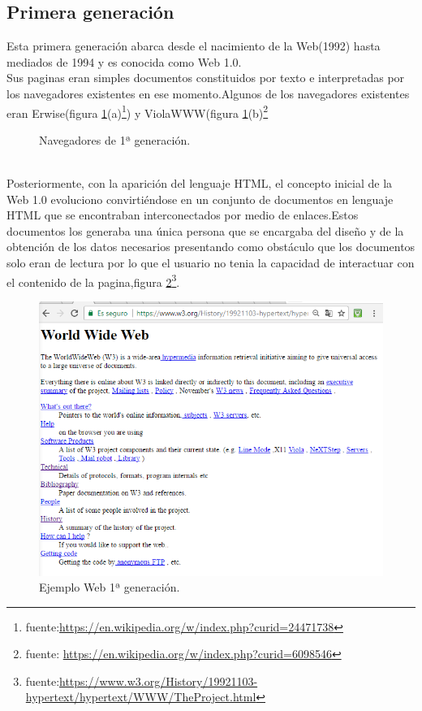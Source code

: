 \subsection*{Primera generación}
Esta primera generación abarca desde el nacimiento de la Web(1992) hasta mediados de 1994 y es conocida como Web 1.0. 
\\Sus paginas eran simples documentos constituidos por texto e interpretadas por los navegadores existentes en ese momento.Algunos de los navegadores existentes eran Erwise(figura \ref{fig:Erwise5}(a)\footnote{fuente:\url{https://en.wikipedia.org/w/index.php?curid=24471738}}) y ViolaWWW(figura \ref{fig:Erwise5}(b)\footnote{fuente:  \url{https://en.wikipedia.org/w/index.php?curid=6098546}}
\begin{figure}[!h]
\centering
{}
\caption{Navegadores de 1ª generación.} \label{fig:Erwise5}
\end{figure}
\\Posteriormente, con la aparición del lenguaje HTML, el concepto inicial de la Web 1.0 evoluciono convirtiéndose en un conjunto de documentos en lenguaje HTML que se encontraban interconectados por medio de enlaces.Estos documentos los generaba una única persona que se encargaba del diseño y de la obtención de los datos necesarios presentando como obstáculo que los documentos solo eran de lectura por lo que el usuario no tenia la capacidad de interactuar con el contenido de la pagina,figura \ref{fig:primera_Web}\footnote{fuente:\url{https://www.w3.org/History/19921103-hypertext/hypertext/WWW/TheProject.html}}.
\begin{figure}[!h]
\centering
\includegraphics[width=0.4\linewidth]{Figures/primera_Web}
\decoRule
\caption[Ejemplo Web 1ª generación]{Ejemplo Web 1ª generación.}
\label{fig:primera_Web}
\end{figure}
